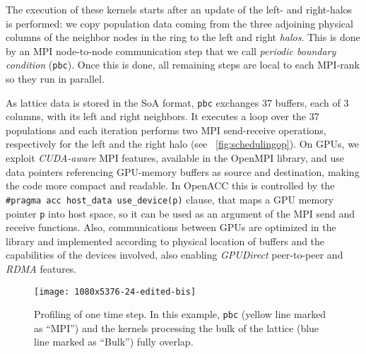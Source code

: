 \documentclass[times]{cpeauth}
\begin{document}
The execution of these kernels starts after an update of the left- and 
right-halos is performed:
we copy population data coming from the three adjoining physical columns 
of the neighbor nodes in the ring to the left and right {\em halos}.
%
This is done by an MPI node-to-node communication step that we call 
{\em periodic boundary condition} ({\tt pbc}).
%
Once this is done, all remaining steps are local to each MPI-rank so 
they run in parallel.

As lattice data is stored in the SoA format, {\tt pbc} exchanges 37
buffers, each of 3 columns, with its left  and right neighbors. 
%
It executes a loop over the 37 populations and each iteration performs 
two MPI send-receive operations, respectively for the left and the 
right halo (see \figurename~\ref{fig:schedulingop}).
%
On GPUs, we exploit {\em CUDA-aware} MPI features, available in the OpenMPI 
library, and use data pointers referencing GPU-memory 
buffers as source and destination, making the code more compact and readable.
%
In OpenACC this is controlled by the {\tt \#pragma acc host\_data
use\_device(p)} clause, that maps a GPU memory pointer {\tt p} into host
space, so it can be used as an argument of the MPI send and receive functions.
%
Also, communications between GPUs are optimized in the library 
and implemented according to physical location of buffers and the 
capabilities of the devices involved, also enabling {\em GPUDirect} 
peer-to-peer and {\em RDMA} features. 

%
\begin{figure}
\centering
\texttt{[image: 1080x5376-24-edited-bis]}
\caption{\label{fig:scheduling} 
Profiling of one time step. In this example,
{\tt pbc} (yellow line marked as ``MPI'') and the kernels processing 
the bulk of the lattice (blue line marked as ``Bulk'') fully overlap.
}
\end{figure}
%
\end{document}
